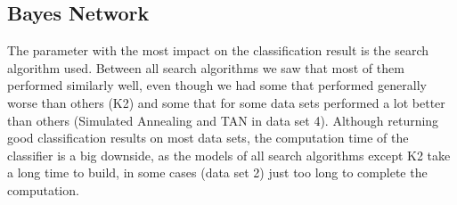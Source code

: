 \documentclass{article}
\begin{document}
\subsection{Bayes Network}

The parameter with the most impact on the classification result is the search algorithm used. Between all search algorithms we saw that most of them performed similarly well, even though we had some that performed generally worse than others (K2) and some that for some data sets performed a lot better than others (Simulated Annealing and TAN in data set 4). Although returning good classification results on most data sets, the computation time of the classifier is a big downside, as the models of all search algorithms except K2 take a long time to build, in some cases (data set 2) just too long to complete the computation.
\end{document}
